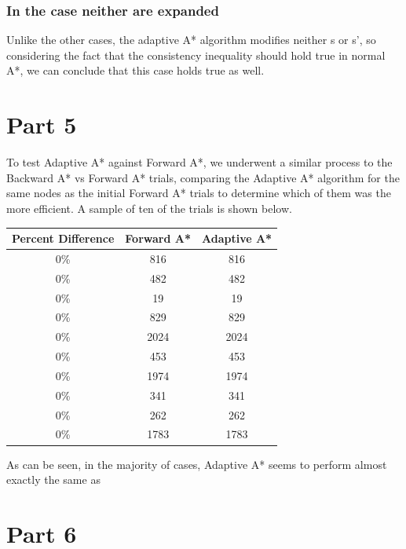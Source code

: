 \documentclass{article}
\begin{document}
\subsubsection{In the case neither are expanded}
Unlike the other cases, the adaptive A* algorithm modifies neither s or s', so considering the fact that the consistency inequality should hold true in normal A*, we can conclude that this case holds true as well.
\section{Part 5}
To test Adaptive A* against Forward A*, we underwent a similar process to the Backward A* vs Forward A* trials, comparing the Adaptive A* algorithm for the same nodes as the initial Forward A* trials to determine which of them was the more efficient. A sample of ten of the trials is shown below.

\begin{center}
	\begin{tabular}{|c|c|c|}
		\hline
		Percent Difference & Forward A* & Adaptive A* \\
		\hline
		0\% & 816 & 816 \\
		0\% & 482 & 482 \\
		0\% & 19 & 19 \\
		0\% & 829 & 829 \\
		0\% & 2024 & 2024 \\
		0\% & 453 & 453 \\
		0\% & 1974 & 1974 \\
		0\% & 341 & 341 \\
		0\% & 262 & 262 \\
		0\% & 1783 & 1783 \\
		\hline
	\end{tabular}
\end{center}
As can be seen, in the majority of cases, Adaptive A* seems to perform almost exactly the same as 

\section{Part 6}
\end{document}
